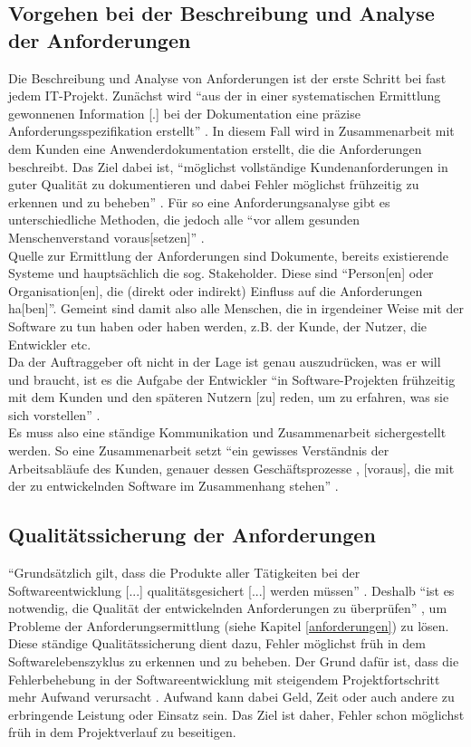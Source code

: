\documentclass [12pt, a4paper, oneside, titlepage, ngerman]{article}
\begin{document}
\subsection{Vorgehen bei der Beschreibung und Analyse der Anforderungen}
Die Beschreibung und Analyse von Anforderungen ist der erste Schritt bei fast jedem IT-Projekt. Zunächst wird "`aus der in einer systematischen Ermittlung gewonnenen Information [.] bei der Dokumentation eine präzise Anforderungsspezifikation erstellt"' \cite[S.44]{partsch2010}. In diesem Fall wird in Zusammenarbeit mit dem Kunden eine Anwenderdokumentation erstellt, die die Anforderungen beschreibt. Das Ziel dabei ist, "`möglichst vollständige Kundenanforderungen in guter Qualität zu dokumentieren und dabei Fehler möglichst frühzeitig zu erkennen und zu beheben"' \cite[S.11]{PohlRupp2015}. Für so eine Anforderungsanalyse gibt es unterschiedliche Methoden, die jedoch alle "`vor allem gesunden Menschenverstand voraus[setzen]"' \cite[S.58]{partsch2010}.\\
Quelle zur Ermittlung der Anforderungen sind Dokumente, bereits existierende Systeme und hauptsächlich die sog. Stakeholder. Diese sind "`Person[en] oder Organisation[en], die (direkt oder indirekt) Einfluss auf die Anforderungen ha[ben]"'\cite[S.21]{PohlRupp2015}. Gemeint sind damit also alle Menschen, die in irgendeiner Weise mit der Software zu tun haben oder haben werden, z.B. der Kunde, der Nutzer, die Entwickler etc. \\
Da der Auftraggeber oft nicht in der Lage ist genau auszudrücken, was er will und braucht, ist es die Aufgabe der Entwickler "`in Software-Projekten frühzeitig mit dem Kunden und den späteren Nutzern [zu] reden, um zu erfahren, was sie sich vorstellen"' \cite[S.15]{kleuker2006}.\\
Es muss also eine ständige Kommunikation und Zusammenarbeit sichergestellt werden. So eine Zusammenarbeit setzt "`ein gewisses Verständnis der Arbeitsabläufe des Kunden, genauer dessen Geschäftsprozesse \cite[vgl.][]{Gad03}, [voraus], die mit der zu entwickelnden Software im Zusammenhang stehen"' \cite[S.15]{kleuker2006}.


\subsection{Qualitätssicherung der Anforderungen}
"`Grundsätzlich gilt, dass die Produkte aller Tätigkeiten bei der Softwareentwicklung [...] qualitätsgesichert [...] werden müssen"' \cite[S.55]{Winter1999}. Deshalb "`ist es notwendig, die Qualität der entwickelnden Anforderungen zu überprüfen"' \cite[S.95]{PohlRupp2015}, um Probleme der Anforderungsermittlung (siehe Kapitel \ref{anforderungen}) zu lösen.  \\
Diese ständige Qualitätssicherung dient dazu, Fehler möglichst früh in dem Softwarelebenszyklus zu erkennen und zu beheben. Der Grund dafür ist, dass die Fehlerbehebung in der Softwareentwicklung mit steigendem Projektfortschritt mehr Aufwand verursacht \cite[vgl.][S.2]{hussmann}. Aufwand kann dabei Geld, Zeit oder auch andere zu erbringende Leistung oder Einsatz sein. Das Ziel ist daher, Fehler schon möglichst früh in dem Projektverlauf zu beseitigen. \\
\end{document}
